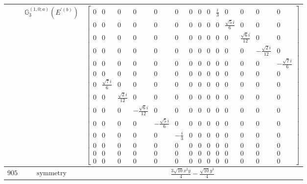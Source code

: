 \documentclass[fleqn,8pt,landscape]{jsarticle}
\begin{document}
\begin{longtable}{ccc}
$  $ & $ \mathbb{G}_{3}^{(1,0;a)}(E^{\prime(b)}) $ & $ \begin{bmatrix} 0 & 0 & 0 & 0 & 0 & 0 & 0 & 0 & 0 & \frac{i}{3} & 0 & 0 & 0 & 0 \\ 0 & 0 & 0 & 0 & 0 & 0 & 0 & 0 & 0 & 0 & \frac{\sqrt{5} i}{6} & 0 & 0 & 0 \\ 0 & 0 & 0 & 0 & 0 & 0 & 0 & 0 & 0 & 0 & 0 & \frac{\sqrt{6} i}{12} & 0 & 0 \\ 0 & 0 & 0 & 0 & 0 & 0 & 0 & 0 & 0 & 0 & 0 & 0 & - \frac{\sqrt{2} i}{12} & 0 \\ 0 & 0 & 0 & 0 & 0 & 0 & 0 & 0 & 0 & 0 & 0 & 0 & 0 & - \frac{\sqrt{7} i}{6} \\ 0 & 0 & 0 & 0 & 0 & 0 & 0 & 0 & 0 & 0 & 0 & 0 & 0 & 0 \\ 0 & \frac{\sqrt{7} i}{6} & 0 & 0 & 0 & 0 & 0 & 0 & 0 & 0 & 0 & 0 & 0 & 0 \\ 0 & 0 & \frac{\sqrt{2} i}{12} & 0 & 0 & 0 & 0 & 0 & 0 & 0 & 0 & 0 & 0 & 0 \\ 0 & 0 & 0 & - \frac{\sqrt{6} i}{12} & 0 & 0 & 0 & 0 & 0 & 0 & 0 & 0 & 0 & 0 \\ 0 & 0 & 0 & 0 & - \frac{\sqrt{5} i}{6} & 0 & 0 & 0 & 0 & 0 & 0 & 0 & 0 & 0 \\ 0 & 0 & 0 & 0 & 0 & - \frac{i}{3} & 0 & 0 & 0 & 0 & 0 & 0 & 0 & 0 \\ 0 & 0 & 0 & 0 & 0 & 0 & 0 & 0 & 0 & 0 & 0 & 0 & 0 & 0 \\ 0 & 0 & 0 & 0 & 0 & 0 & 0 & 0 & 0 & 0 & 0 & 0 & 0 & 0 \\ 0 & 0 & 0 & 0 & 0 & 0 & 0 & 0 & 0 & 0 & 0 & 0 & 0 & 0 \end{bmatrix} $ \\ \hline
$ 905 $ & $ \text{symmetry} $ & $ \frac{3 \sqrt{10} x^{2} y}{4} - \frac{\sqrt{10} y^{3}}{4} $ \\

\end{longtable}
\end{document}
